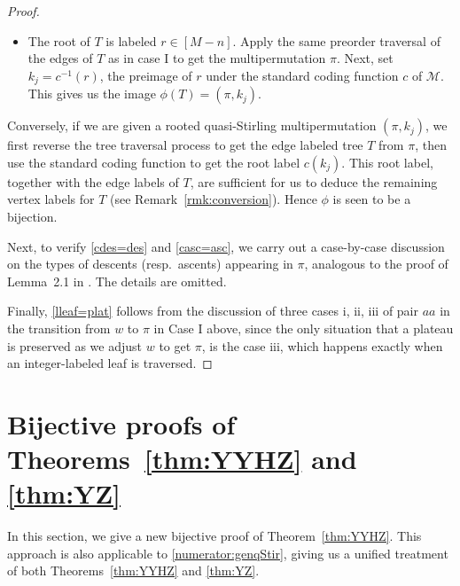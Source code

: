 \documentclass[11pt,reqno]{amsart}
\numberwithin{equation}{section}
\theoremstyle{plain}
\theoremstyle{definition}
\newcommand{\M}{\mathcal{M}}
\begin{document}
\begin{proof}
\begin{itemize}
	\begin{align*}
	& 2(M-\sum_{1\le i\le n}\chi(m_i>1))-\sum_{1\le i\le n}\chi(m_i=1)-\sum_{1\le i\le n}(m_i-2)\chi(m_i>1)\\
	& =2M-\sum_{1\le i\le n}m_i=M.
	\end{align*}
	\item[Case II.] The root of $T$ is labeled $r\in[M-n]$. Apply the same preorder traversal of the edges of $T$ as in case I to get the multipermutation $\pi$. Next, set $k_j=c^{-1}(r)$, the preimage of $r$ under the standard coding function $c$ of $\M$. This gives us the image $\phi(T)=(\pi,k_j)$.
\end{itemize}

Conversely, if we are given a rooted quasi-Stirling multipermutation $(\pi,k_j)$, we first reverse the tree traversal process to get the edge labeled tree $T$ from $\pi$, then use the standard coding function to get the root label $c(k_j)$. This root label, together with the edge labels of $T$, are sufficient for us to deduce the remaining vertex labels for $T$ (see Remark~\ref{rmk:conversion}). Hence $\phi$ is seen to be a bijection.

Next, to verify \eqref{cdes=des} and \eqref{casc=asc}, we carry out a case-by-case discussion on the types of descents (resp.~ascents) appearing in $\pi$, analogous to the proof of Lemma~2.1 in \cite{Eli}. The details are omitted.

Finally, \eqref{lleaf=plat} follows from the discussion of three cases i, ii, iii of pair $aa$ in the transition from $w$ to $\pi$ in Case I above, since the only situation that a plateau is preserved as we adjust $w$ to get $\pi$, is the case iii, which happens exactly when an integer-labeled leaf is traversed.
\end{proof}


\section{Bijective proofs of Theorems~\ref{thm:YYHZ} and \ref{thm:YZ}}\label{sect:thm1-2}

In this section, we give a new bijective proof of Theorem~\ref{thm:YYHZ}. This approach is also applicable to \eqref{numerator:genqStir}, giving us a unified treatment of both Theorems~\ref{thm:YYHZ} and \ref{thm:YZ}.
\end{document}
